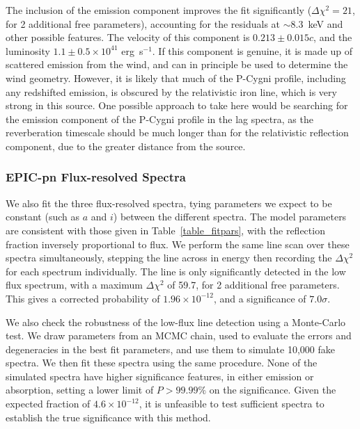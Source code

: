 \documentclass[10pt, a4paper]{article}
\begin{document}
The inclusion of the emission component improves the fit significantly ($\Delta\chi^2=21$, for 2 additional free parameters), accounting for the residuals at $\sim8.3$~keV and other possible features. The velocity of this component is $0.213\pm0.015c$, and the luminosity $1.1\pm0.5\times10^{41}$ erg~s$^{-1}$. If this component is genuine, it is made up of scattered emission from the wind, and can in principle be used to determine the wind geometry. However, it is likely that much of the P-Cygni profile, including any redshifted emission, is obscured by the relativistic iron line, which is very strong in this source. One possible approach to take here would be searching for the emission component of the P-Cygni profile in the lag spectra, as the reverberation timescale should be much longer than for the relativistic reflection component, due to the greater distance from the source.


\subsubsection*{EPIC-pn Flux-resolved Spectra}
We also fit the three flux-resolved spectra, tying parameters we expect to be constant (such as $a$ and $i$) between the different spectra. The model parameters are consistent with those given in Table~\ref{table_fitpars}, with the reflection fraction inversely proportional to flux. We perform the same line scan over these spectra simultaneously, stepping the line across in energy then recording the $\Delta\chi^2$ for each spectrum individually. The line is only significantly detected in the low flux spectrum, with a maximum $\Delta\chi^2$ of 59.7, for 2 additional free parameters. This gives a corrected probability of $1.96\times10^{-12}$, and a significance of $7.0\sigma$. 

We also check the robustness of the low-flux line detection using a Monte-Carlo test. We draw parameters from an MCMC chain, used to evaluate the errors and degeneracies in the best fit parameters, and use them to simulate 10,000 fake spectra. We then fit these spectra using the same procedure. None of the simulated spectra have higher significance features, in either emission or absorption, setting a lower limit of $P>99.99\%$ on the significance. Given the expected fraction of $4.6\times10^{-12}$, it is unfeasible to test sufficient spectra to establish the true significance with this method.
\end{document}
